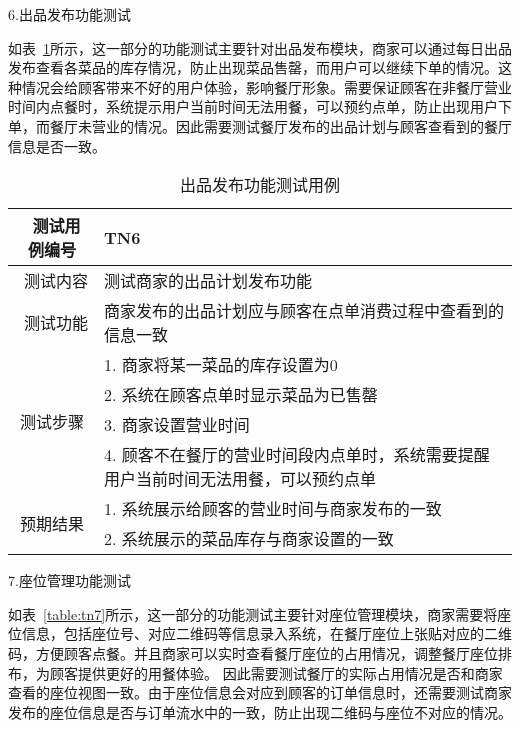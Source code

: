 6.出品发布功能测试

如表~\ref{table:tn6}所示，这一部分的功能测试主要针对出品发布模块，商家可以通过每日出品发布查看各菜品的库存情况，防止出现菜品售罄，而用户可以继续下单的情况。这种情况会给顾客带来不好的用户体验，影响餐厅形象。需要保证顾客在非餐厅营业时间内点餐时，系统提示用户当前时间无法用餐，可以预约点单，防止出现用户下单，而餐厅未营业的情况。因此需要测试餐厅发布的出品计划与顾客查看到的餐厅信息是否一致。
\begin{table}[htbp!]
    \footnotesize
    \centering
    \caption{出品发布功能测试用例}
    \vspace{2mm}
    \begin{tabular}{cp{11.5cm}}
     \hline
     \ 测试用例编号 & TN6 \\ 
     \hline
     \ 测试内容 & 测试商家的出品计划发布功能\\ 
     \hline
     \ 测试功能 & 商家发布的出品计划应与顾客在点单消费过程中查看到的信息一致 \\ 
     \hline
     \multirow{4}{*}{测试步骤}
      & 1. 商家将某一菜品的库存设置为0\\
      & 2. 系统在顾客点单时显示菜品为已售罄\\
      & 3. 商家设置营业时间\\
      & 4. 顾客不在餐厅的营业时间段内点单时，系统需要提醒用户当前时间无法用餐，可以预约点单\\
      \hline
     \multirow{2}{*}{预期结果}
      & 1. 系统展示给顾客的营业时间与商家发布的一致\\
      & 2. 系统展示的菜品库存与商家设置的一致\\
    \hline
    \end{tabular}   
    \label{table:tn6}
\end{table}

7.座位管理功能测试

如表~\ref{table:tn7}所示，这一部分的功能测试主要针对座位管理模块，商家需要将座位信息，包括座位号、对应二维码等信息录入系统，在餐厅座位上张贴对应的二维码，方便顾客点餐。并且商家可以实时查看餐厅座位的占用情况，调整餐厅座位排布，为顾客提供更好的用餐体验。
因此需要测试餐厅的实际占用情况是否和商家查看的座位视图一致。由于座位信息会对应到顾客的订单信息时，还需要测试商家发布的座位信息是否与订单流水中的一致，防止出现二维码与座位不对应的情况。\\

